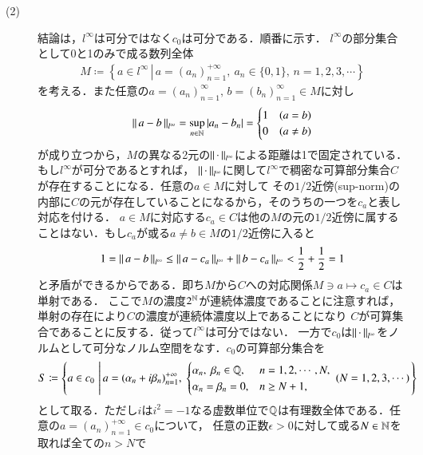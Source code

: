 \begin{prf}
\begin{description}
	\item[(2)]
		結論は，$l^{\infty}$は可分ではなく$c_0$は可分である．順番に示す．
		$l^{\infty}$の部分集合として0と1のみで成る数列全体
		\begin{align}
			M \coloneqq \left\{a \in l^{\infty}\, \left|\, a = (a_n)_{n=1}^{+\infty},\ a_n \in \{0,1\},\, n=1,2,3,\cdots \right.\right\}
		\end{align}
		を考える．また任意の$a=(a_n)_{n=1}^{\infty},\, b=(b_n)_{n=1}^{\infty} \in M$に対し
		\begin{align}
			\left\|\, a-b\, \right\|_{l^{\infty}} = \operatorname*{sup}_{n \in \mathbb{N}} |a_n - b_n| = \begin{cases}
				1 & (a = b) \\
				0 & (a \neq b)
			\end{cases}
		\end{align}
		が成り立つから，$M$の異なる2元の$\left\|\, \cdot\, \right\|_{l^{\infty}}$による距離は1で固定されている．もし$l^{\infty}$が可分であるとすれば，
		$\left\|\, \cdot\, \right\|_{l^{\infty}}$に関して$l^{\infty}$で稠密な可算部分集合$C$が存在することになる．任意の$a \in M$に対して
		その$1/2$近傍(sup-norm)の内部に$C$の元が存在していることになるから，そのうちの一つを$c_a$と表し対応を付ける．
		$a \in M$に対応する$c_a \in C$は他の$M$の元の$1/2$近傍に属することはない．もし$c_a$が或る$a \neq b \in M$の$1/2$近傍に入ると
		\begin{align}
			1 = \left\|\, a-b\, \right\|_{l^{\infty}} \leq \left\|\, a - c_a\, \right\|_{l^{\infty}} + \left\|\, b-c_a\, \right\|_{l^{\infty}} < \frac{1}{2} + \frac{1}{2} = 1
		\end{align}
		と矛盾ができるからである．即ち$M$から$C$への対応関係$M \ni a \longmapsto c_a \in C$は単射である．
		ここで$M$の濃度$2^{\mathbb{N}}$が連続体濃度であることに注意すれば，単射の存在により$C$の濃度が連続体濃度以上であることになり
		$C$が可算集合であることに反する．従って$l^{\infty}$は可分ではない．\mbox{}
		一方で$c_0$は$\left\|\, \cdot\, \right\|_{l^{\infty}}$をノルムとして可分なノルム空間をなす．$c_0$の可算部分集合を
		\begin{align}
			S \coloneqq 
			\left\{a \in c_0\, \left|\, 
			a = (\alpha_n + i \beta_n)_{n=1}^{+\infty},\ 
			\begin{cases}
				\alpha_n,\ \beta_n \in \Q, & n=1,2,\cdots,N,\\
				\alpha_n=\beta_n=0, & n \geq N+1,
			\end{cases}
			\ (N = 1,2,3,\cdots) \right.\right\}
		\end{align}
		として取る．ただし$i$は$i^2 = -1$なる虚数単位で$\mathbb{Q}$は有理数全体である．任意の$a=(a_n)_{n=1}^{+\infty} \in c_0$について，
		任意の正数$\epsilon > 0$に対して或る$N \in \mathbb{N}$を取れば全ての$n > N$で

\end{description}
\end{prf}
